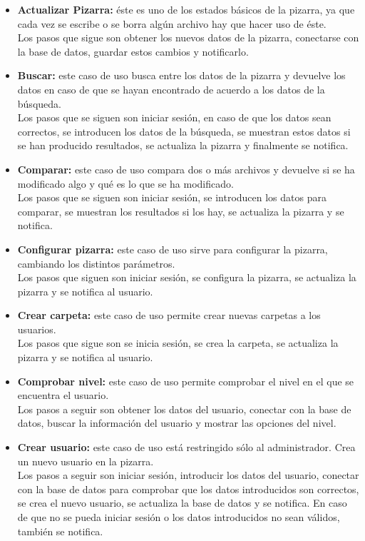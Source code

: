 \begin{itemize}
\item \textbf{Actualizar Pizarra:} éste es uno de los estados básicos de la pizarra, ya que cada vez se escribe o se borra algún archivo hay que hacer uso de éste.\\
Los pasos que sigue son obtener los nuevos datos de la pizarra, conectarse con la base de datos, guardar estos cambios y notificarlo.

\item \textbf{Buscar:} este caso de uso busca entre los datos de la pizarra y devuelve los datos en caso de que se hayan encontrado de acuerdo a los datos de la búsqueda.\\
Los pasos que se siguen son iniciar sesión, en caso de que los datos sean correctos, se introducen los datos de la búsqueda, se muestran estos datos si se han producido resultados, se actualiza la pizarra y finalmente se notifica.

\item \textbf{Comparar:} este caso de uso compara dos o más archivos y devuelve si se ha modificado algo y qué es lo que se ha modificado.\\
Los pasos que se siguen son iniciar sesión, se introducen los datos para comparar, se muestran los resultados si los hay, se actualiza la pizarra y se notifica.

\item \textbf{Configurar pizarra:} este caso de uso sirve para configurar la pizarra, cambiando los distintos parámetros.\\
Los pasos que siguen son iniciar sesión, se configura la pizarra, se actualiza la pizarra y se notifica al usuario.

\item \textbf{Crear carpeta:} este caso de uso permite crear nuevas carpetas a los usuarios.\\
Los pasos que sigue son se inicia sesión, se crea la carpeta, se actualiza la pizarra y se notifica al usuario.

\item \textbf{Comprobar nivel:} este caso de uso permite comprobar el nivel en el que se encuentra el usuario.\\
Los pasos a seguir son obtener los datos del usuario, conectar con la base de datos, buscar la información del usuario y mostrar las opciones del nivel.

\item \textbf{Crear usuario:} este caso de uso está restringido sólo al administrador. Crea un nuevo usuario en la pizarra.\\
Los pasos a seguir son iniciar sesión, introducir los datos del usuario, conectar con la base de datos para comprobar que los datos introducidos son correctos, se crea el nuevo usuario, se actualiza la base de datos y se notifica. En caso de que no se pueda iniciar sesión o los datos introducidos no sean válidos, también se notifica.


\end{itemize}
